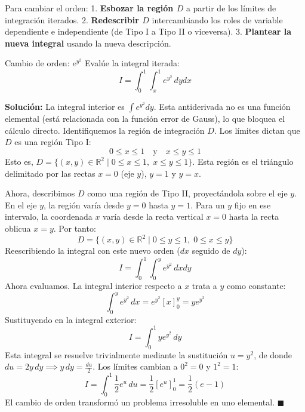 \documentclass[11pt,a4paper]{article}
\begin{document}
Para cambiar el orden:
1. \textbf{Esbozar la región $D$} a partir de los límites de integración iterados.
2. \textbf{Redescribir $D$} intercambiando los roles de variable dependiente e independiente (de Tipo I a Tipo II o viceversa).
3. \textbf{Plantear la nueva integral} usando la nueva descripción.

\begin{ejemplobox}{Cambio de orden: $e^{y^2}$}{}
    Evalúe la integral iterada:
    \[
    I = \int_0^1 \int_x^1 e^{y^2} \, dy dx
    \]
\end{ejemplobox}

\textbf{Solución:}
La integral interior es $\int e^{y^2} dy$. Esta antiderivada no es una función elemental (está relacionada con la función error de Gauss), lo que bloquea el cálculo directo.
Identifiquemos la región de integración $D$. Los límites dictan que $D$ es una región Tipo I:
\[
0 \leq x \leq 1 \quad \text{y} \quad x \leq y \leq 1
\]
Esto es, $D = \{ (x,y) \in \mathbb{R}^2 \mid 0 \leq x \leq 1, \; x \leq y \leq 1 \}$.
Esta región es el triángulo delimitado por las rectas $x=0$ (eje $y$), $y=1$ y $y=x$.

\begin{center}
\end{center}

Ahora, describimos $D$ como una región de Tipo II, proyectándola sobre el eje $y$. En el eje $y$, la región varía desde $y=0$ hasta $y=1$. Para un $y$ fijo en ese intervalo, la coordenada $x$ varía desde la recta vertical $x=0$ hasta la recta oblicua $x=y$. Por tanto:
\[
D = \{ (x,y) \in \mathbb{R}^2 \mid 0 \leq y \leq 1, \; 0 \leq x \leq y \}
\]
Reescribiendo la integral con este nuevo orden ($dx$ seguido de $dy$):
\[
I = \int_0^1 \int_0^y e^{y^2} \, dx dy
\]
Ahora evaluamos. La integral interior respecto a $x$ trata a $y$ como constante:
\[
\int_0^y e^{y^2} \, dx = e^{y^2} \left[ x \right]_0^y = y e^{y^2}
\]
Sustituyendo en la integral exterior:
\[
I = \int_0^1 y e^{y^2} \, dy
\]
Esta integral se resuelve trivialmente mediante la sustitución $u = y^2$, de donde $du = 2y \, dy \implies y \, dy = \frac{du}{2}$. Los límites cambian a $0^2=0$ y $1^2=1$:
\[
I = \int_0^1 \frac{1}{2} e^u \, du = \frac{1}{2} \left[ e^u \right]_0^1 = \frac{1}{2} (e - 1)
\]
El cambio de orden transformó un problema irresoluble en uno elemental. $\blacksquare$
\end{document}
